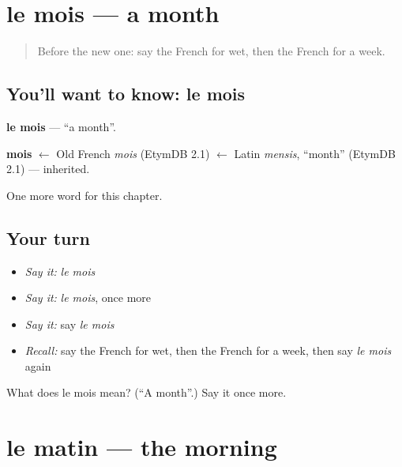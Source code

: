 \section[le mois]{le mois — a month}

\label{lesson:FR-C95-mois}



\begin{quote}
Before the new one: say the French for wet, then the French for a week.
\end{quote}

\subsection*{You'll want to know: le mois}
\textbf{le mois} — \textquotedblleft{}a month\textquotedblright{}.

\begin{cousinweb}
\textbf{mois} $\leftarrow$ Old French \emph{mois} (EtymDB 2.1) $\leftarrow$ Latin \emph{mensis}, \textquotedblleft{}month\textquotedblright{} (EtymDB 2.1) — inherited.
\end{cousinweb}

\begin{grammarlens}[title={What you've built}]
One more word for this chapter.
\end{grammarlens}

\subsection*{Your turn}
\begin{itemize}
\raggedright
  \item \emph{Say it:} \emph{le mois}
  \item \emph{Say it:} \emph{le mois}, once more
  \item \emph{Say it:} say \emph{le mois}
  \item \emph{Recall:} say the French for wet, then the French for a week, then say \emph{le mois} again
\end{itemize}

\begin{tcolorbox}[breakable,colback=teal!4,colframe=teal!35!black,title={Before you move on}]
What does le mois mean? (\textquotedblleft{}A month\textquotedblright{}.) Say it once more.
\end{tcolorbox}
\section[le matin]{le matin — the morning}

